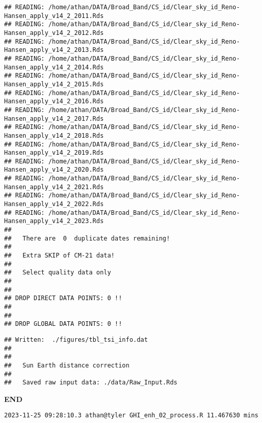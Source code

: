 \documentclass[
  10pt,
  a4paper,oneside]{article}
\begin{document}
\begin{verbatim}
## READING: /home/athan/DATA/Broad_Band/CS_id/Clear_sky_id_Reno-Hansen_apply_v14_2_2011.Rds 
## READING: /home/athan/DATA/Broad_Band/CS_id/Clear_sky_id_Reno-Hansen_apply_v14_2_2012.Rds 
## READING: /home/athan/DATA/Broad_Band/CS_id/Clear_sky_id_Reno-Hansen_apply_v14_2_2013.Rds 
## READING: /home/athan/DATA/Broad_Band/CS_id/Clear_sky_id_Reno-Hansen_apply_v14_2_2014.Rds 
## READING: /home/athan/DATA/Broad_Band/CS_id/Clear_sky_id_Reno-Hansen_apply_v14_2_2015.Rds 
## READING: /home/athan/DATA/Broad_Band/CS_id/Clear_sky_id_Reno-Hansen_apply_v14_2_2016.Rds 
## READING: /home/athan/DATA/Broad_Band/CS_id/Clear_sky_id_Reno-Hansen_apply_v14_2_2017.Rds 
## READING: /home/athan/DATA/Broad_Band/CS_id/Clear_sky_id_Reno-Hansen_apply_v14_2_2018.Rds 
## READING: /home/athan/DATA/Broad_Band/CS_id/Clear_sky_id_Reno-Hansen_apply_v14_2_2019.Rds 
## READING: /home/athan/DATA/Broad_Band/CS_id/Clear_sky_id_Reno-Hansen_apply_v14_2_2020.Rds 
## READING: /home/athan/DATA/Broad_Band/CS_id/Clear_sky_id_Reno-Hansen_apply_v14_2_2021.Rds 
## READING: /home/athan/DATA/Broad_Band/CS_id/Clear_sky_id_Reno-Hansen_apply_v14_2_2022.Rds 
## READING: /home/athan/DATA/Broad_Band/CS_id/Clear_sky_id_Reno-Hansen_apply_v14_2_2023.Rds 
## 
##   There are  0  duplicate dates remaining!
## 
##   Extra SKIP of CM-21 data!
## 
##   Select quality data only
## 
## 
## DROP DIRECT DATA POINTS: 0 !!
## 
## 
## DROP GLOBAL DATA POINTS: 0 !!
\end{verbatim}

\begin{verbatim}
## Written:  ./figures/tbl_tsi_info.dat 
## 
## 
##   Sun Earth distance correction
## 
##   Saved raw input data: ./data/Raw_Input.Rds
\end{verbatim}

\textbf{END}

\begin{verbatim}
2023-11-25 09:28:10.3 athan@tyler GHI_enh_02_process.R 11.467630 mins
\end{verbatim}
\end{document}
